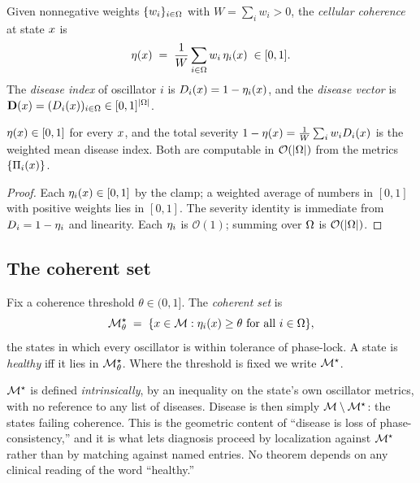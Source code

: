 \begin{definition}
\label{cfc:def:cell-coherence}
Given nonnegative weights $\{w_i\}_{i\in\Omega}$ with $W=\sum_i w_i>0$, the
\emph{cellular coherence} at state $x$ is
\begin{equation}
\eta(x)\;=\;\frac{1}{W}\sum_{i\in\Omega} w_i\,\eta_i(x)\;\in[0,1].
\label{cfc:eq:cell-coherence}
\end{equation}
The \emph{disease index} of oscillator $i$ is $D_i(x)=1-\eta_i(x)$, and
the \emph{disease vector} is $\mathbf{D}(x)=(D_i(x))_{i\in\Omega}\in[0,1]^{|\Omega|}$.
\end{definition}

\begin{proposition}
\label{cfc:prop:coherence-bounds}
$\eta(x)\in[0,1]$ for every $x$, and the total severity
$1-\eta(x)=\tfrac1W\sum_i w_i D_i(x)$ is the weighted mean disease index.
Both are computable in $\mathcal{O}(|\Omega|)$ from the metrics
$\{\Pi_i(x)\}$.
\end{proposition}

\begin{proof}
Each $\eta_i(x)\in[0,1]$ by the clamp; a weighted average of numbers in
$[0,1]$ with positive weights lies in $[0,1]$. The severity identity is
immediate from $D_i=1-\eta_i$ and linearity. Each $\eta_i$ is
$\mathcal{O}(1)$; summing over $\Omega$ is $\mathcal{O}(|\Omega|)$.
\end{proof}

\subsection{The coherent set}

\begin{definition}
\label{cfc:def:coherent}
Fix a coherence threshold $\theta\in(0,1]$. The \emph{coherent set} is
\begin{equation}
\Coh_\theta\;=\;\set{\st\in\Man:\ecoh_i(\st)\ge\theta\ \text{for all }i\in\Dom},
\label{cfc:eq:coherent}
\end{equation}
the states in which every oscillator is within tolerance of phase-lock. A
state is \emph{healthy} iff it lies in $\mathcal{M}^{\star}_\theta$. Where the threshold is
fixed we write $\mathcal{M}^{\star}$.
\end{definition}

\begin{remark}
\label{cfc:rem:health-region}
$\mathcal{M}^{\star}$ is defined \emph{intrinsically}, by an inequality on the state's own
oscillator metrics, with no reference to any list of diseases. Disease is then
simply $\mathcal{M}\setminus\mathcal{M}^{\star}$: the states failing coherence. This is the geometric
content of ``disease is loss of phase-consistency,'' and it is what lets
diagnosis proceed by localization against $\mathcal{M}^{\star}$ rather than by matching
against named entries. No theorem depends on any clinical reading of the word
``healthy.''
\end{remark}

